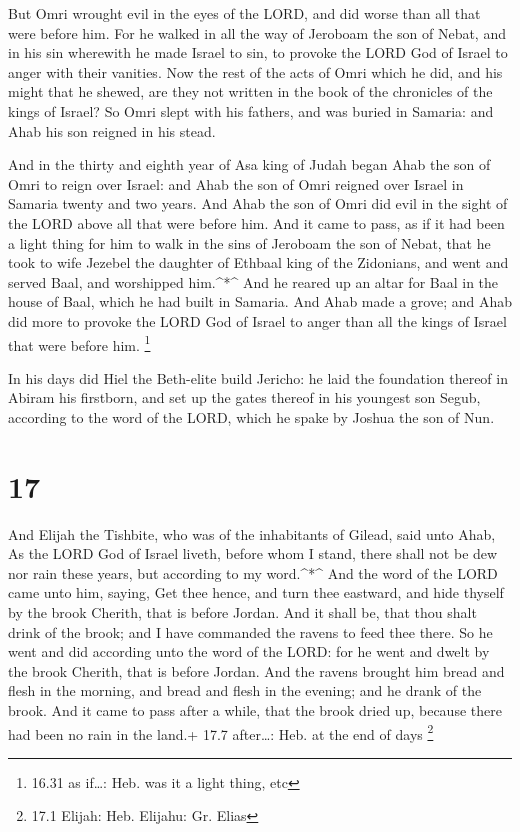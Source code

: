  But Omri wrought evil in the eyes of the LORD, and did
worse than all that were before him.  For he walked in all
the way of Jeroboam the son of Nebat, and in his sin wherewith he made
Israel to sin, to provoke the LORD God of Israel to anger with their
vanities.  Now the rest of the acts of Omri which he did,
and his might that he shewed, are they not written in the book of the
chronicles of the kings of Israel?  So Omri slept with his
fathers, and was buried in Samaria: and Ahab his son reigned in his
stead.

 And in the thirty and eighth year of Asa king of Judah
began Ahab the son of Omri to reign over Israel: and Ahab the son of
Omri reigned over Israel in Samaria twenty and two years. 
And Ahab the son of Omri did evil in the sight of the LORD above all
that were before him.  And it came to pass, as if it had
been a light thing for him to walk in the sins of Jeroboam the son of
Nebat, that he took to wife Jezebel the daughter of Ethbaal king of the
Zidonians, and went and served Baal, and worshipped him.\^{}*\^{}
 And he reared up an altar for Baal in the house of Baal,
which he had built in Samaria.  And Ahab made a grove; and
Ahab did more to provoke the LORD God of Israel to anger than all the
kings of Israel that were before him. \footnote{16.31 as if\ldots: Heb.
  was it a light thing, etc}

 In his days did Hiel the Beth-elite build Jericho: he laid
the foundation thereof in Abiram his firstborn, and set up the gates
thereof in his youngest son Segub, according to the word of the LORD,
which he spake by Joshua the son of Nun.

\hypertarget{section-16}{%
\section{17}\label{section-16}}

 And Elijah the Tishbite, who was of the inhabitants of
Gilead, said unto Ahab, As the LORD God of Israel liveth, before whom I
stand, there shall not be dew nor rain these years, but according to my
word.\^{}*\^{}  And the word of the LORD came unto him,
saying,  Get thee hence, and turn thee eastward, and hide
thyself by the brook Cherith, that is before Jordan.  And it
shall be, that thou shalt drink of the brook; and I have commanded the
ravens to feed thee there.  So he went and did according
unto the word of the LORD: for he went and dwelt by the brook Cherith,
that is before Jordan.  And the ravens brought him bread and
flesh in the morning, and bread and flesh in the evening; and he drank
of the brook.  And it came to pass after a while, that the
brook dried up, because there had been no rain in the land.+ 17.7
after\ldots: Heb. at the end of days \footnote{17.1 Elijah: Heb.
  Elijahu: Gr. Elias}

